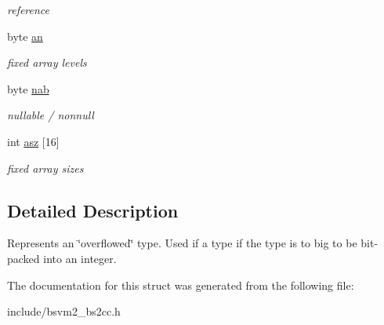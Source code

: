 \begin{DoxyCompactItemize}
\begin{DoxyCompactList}\small\item\em reference \end{DoxyCompactList}\item 
\hypertarget{structBS2CC__TypeOverflow__s_a94a1c61b56a6a1df342d9c353e27448d}{byte \hyperlink{structBS2CC__TypeOverflow__s_a94a1c61b56a6a1df342d9c353e27448d}{an}}\label{structBS2CC__TypeOverflow__s_a94a1c61b56a6a1df342d9c353e27448d}

\begin{DoxyCompactList}\small\item\em fixed array levels \end{DoxyCompactList}\item 
\hypertarget{structBS2CC__TypeOverflow__s_aa42d09c73005e8ec1ef25e986222b7a1}{byte \hyperlink{structBS2CC__TypeOverflow__s_aa42d09c73005e8ec1ef25e986222b7a1}{nab}}\label{structBS2CC__TypeOverflow__s_aa42d09c73005e8ec1ef25e986222b7a1}

\begin{DoxyCompactList}\small\item\em nullable / nonnull \end{DoxyCompactList}\item 
\hypertarget{structBS2CC__TypeOverflow__s_a661f48de347036f84e495bfb0e719c0b}{int \hyperlink{structBS2CC__TypeOverflow__s_a661f48de347036f84e495bfb0e719c0b}{asz} \mbox{[}16\mbox{]}}\label{structBS2CC__TypeOverflow__s_a661f48de347036f84e495bfb0e719c0b}

\begin{DoxyCompactList}\small\item\em fixed array sizes \end{DoxyCompactList}\end{DoxyCompactItemize}


\subsection{Detailed Description}
Represents an \char`\"{}overflowed\char`\"{} type. Used if a type if the type is to big to be bit-\/packed into an integer. 

The documentation for this struct was generated from the following file\-:\begin{DoxyCompactItemize}
\item 
include/bsvm2\-\_\-bs2cc.\-h\end{DoxyCompactItemize}
